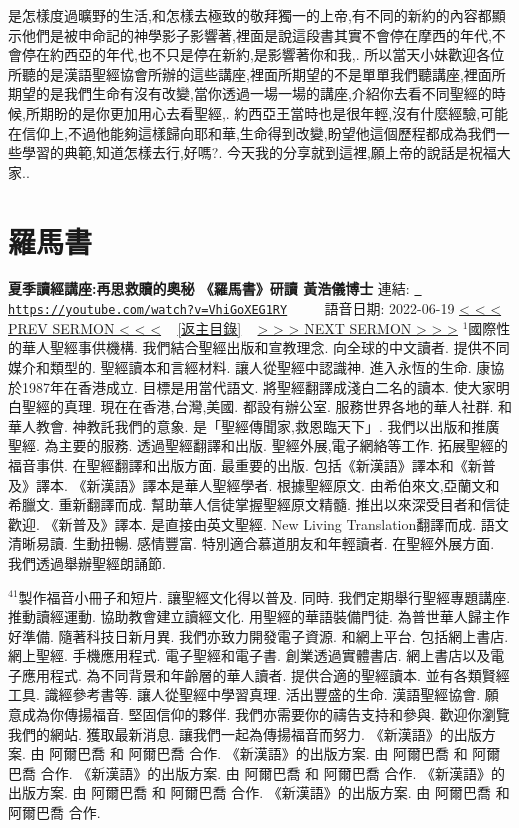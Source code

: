 \documentclass{book}
\begin{document}
是怎樣度過曠野的生活,和怎樣去極致的敬拜獨一的上帝,有不同的新約的內容都顯示他們是被申命記的神學影子影響著,裡面是說這段書其實不會停在摩西的年代,不會停在約西亞的年代,也不只是停在新約,是影響著你和我,.
所以當天小妹歡迎各位所聽的是漢語聖經協會所辦的這些講座,裡面所期望的不是單單我們聽講座,裡面所期望的是我們生命有沒有改變,當你透過一場一場的講座,介紹你去看不同聖經的時候,所期盼的是你更加用心去看聖經,.
約西亞王當時也是很年輕,沒有什麼經驗,可能在信仰上,不過他能夠這樣歸向耶和華,生命得到改變,盼望他這個歷程都成為我們一些學習的典範,知道怎樣去行,好嗎?.
今天我的分享就到這裡,願上帝的說話是祝福大家..
\newpage



\section{羅馬書}
\label{sec:VhiGoXEG1RY}
\textbf{夏季讀經講座:再思救贖的奧秘 《羅馬書》研讀 黃浩儀博士}
\newline
\newline
連結: \href{https://youtube.com/watch?v=VhiGoXEG1RY}{\texttt{ https://youtube.com/watch?v=VhiGoXEG1RY}} ~~~~ 語音日期: 2022-06-19 
\newline
\newline
\hyperref[sec:0UjUn93f77k]{\small{< < < PREV SERMON < < <}}
~
\hyperref[sec:index]{\small{[返主目錄]}}
~
\hyperref[sec:A_3yEYQkm9Y]{\small{> > > NEXT SERMON > > >}}
\newline
\newline
$^{1}$國際性的華人聖經事供機構.
我們結合聖經出版和宣教理念.
向全球的中文讀者.
提供不同媒介和類型的.
聖經讀本和言經材料.
讓人從聖經中認識神.
進入永恆的生命.
康協於1987年在香港成立.
目標是用當代語文.
將聖經翻譯成淺白二名的讀本.
使大家明白聖經的真理.
現在在香港,台灣,美國.
都設有辦公室.
服務世界各地的華人社群.
和華人教會.
神教託我們的意象.
是「聖經傳聞家,救恩臨天下」.
我們以出版和推廣聖經.
為主要的服務.
透過聖經翻譯和出版.
聖經外展,電子網絡等工作.
拓展聖經的福音事供.
在聖經翻譯和出版方面.
最重要的出版.
包括《新漢語》譯本和《新普及》譯本.
《新漢語》譯本是華人聖經學者.
根據聖經原文.
由希伯來文,亞蘭文和希臘文.
重新翻譯而成.
幫助華人信徒掌握聖經原文精髓.
推出以來深受目者和信徒歡迎.
《新普及》譯本.
是直接由英文聖經.
New Living Translation翻譯而成.
語文清晰易讀.
生動扭暢.
感情豐富.
特別適合慕道朋友和年輕讀者.
在聖經外展方面.
我們透過舉辦聖經朗誦節.

$^{41}$製作福音小冊子和短片.
讓聖經文化得以普及.
同時.
我們定期舉行聖經專題講座.
推動讀經運動.
協助教會建立讀經文化.
用聖經的華語裝備門徒.
為普世華人歸主作好準備.
隨著科技日新月異.
我們亦致力開發電子資源.
和網上平台.
包括網上書店.
網上聖經.
手機應用程式.
電子聖經和電子書.
創業透過實體書店.
網上書店以及電子應用程式.
為不同背景和年齡層的華人讀者.
提供合適的聖經讀本.
並有各類賢經工具.
識經參考書等.
讓人從聖經中學習真理.
活出豐盛的生命.
漢語聖經協會.
願意成為你傳揚福音.
堅固信仰的夥伴.
我們亦需要你的禱告支持和參與.
歡迎你瀏覽我們的網站.
獲取最新消息.
讓我們一起為傳揚福音而努力.
《新漢語》的出版方案.
由 阿爾巴喬 和 阿爾巴喬 合作.
《新漢語》的出版方案.
由 阿爾巴喬 和 阿爾巴喬 合作.
《新漢語》的出版方案.
由 阿爾巴喬 和 阿爾巴喬 合作.
《新漢語》的出版方案.
由 阿爾巴喬 和 阿爾巴喬 合作.
《新漢語》的出版方案.
由 阿爾巴喬 和 阿爾巴喬 合作.
\end{document}
